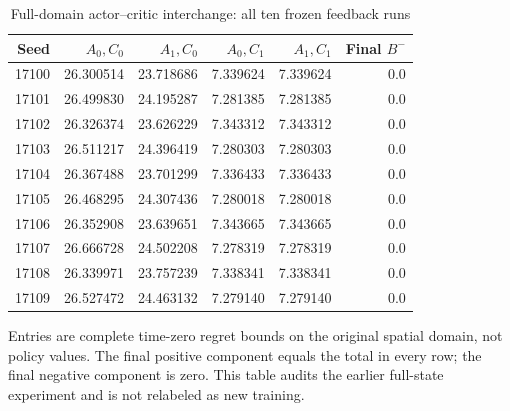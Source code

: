 \begin{table}[htbp]
\centering\small
\caption{Full-domain actor--critic interchange: all ten frozen feedback runs}\label{tab:r19factorial}
\begin{tabular}{rrrrrr}\toprule
Seed & $A_0,C_0$ & $A_1,C_0$ & $A_0,C_1$ & $A_1,C_1$ & Final $B^-$\\
\midrule
17100 & 26.300514 & 23.718686 & 7.339624 & 7.339624 & 0.0\\
17101 & 26.499830 & 24.195287 & 7.281385 & 7.281385 & 0.0\\
17102 & 26.326374 & 23.626229 & 7.343312 & 7.343312 & 0.0\\
17103 & 26.511217 & 24.396419 & 7.280303 & 7.280303 & 0.0\\
17104 & 26.367488 & 23.701299 & 7.336433 & 7.336433 & 0.0\\
17105 & 26.468295 & 24.307436 & 7.280018 & 7.280018 & 0.0\\
17106 & 26.352908 & 23.639651 & 7.343665 & 7.343665 & 0.0\\
17107 & 26.666728 & 24.502208 & 7.278319 & 7.278319 & 0.0\\
17108 & 26.339971 & 23.757239 & 7.338341 & 7.338341 & 0.0\\
17109 & 26.527472 & 24.463132 & 7.279140 & 7.279140 & 0.0\\
\bottomrule
\end{tabular}
\par\smallskip\begin{minipage}{.98\textwidth}\footnotesize Entries are complete time-zero regret bounds on the original spatial domain, not policy values. The final positive component equals the total in every row; the final negative component is zero. This table audits the earlier full-state experiment and is not relabeled as new training.\end{minipage}
\end{table}
